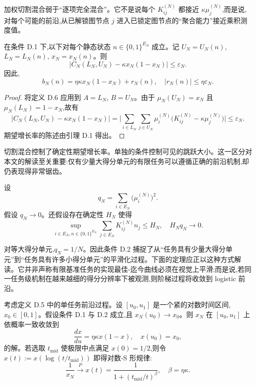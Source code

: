 加权切割混合弱于``逐项完全混合''。它不是说每个 $K^{(N)}_{ij}$ 都接近 $\kappa \mu^{(N)}_{j}$,而是说,对每个可能的前沿,从已解锁图节点 $j$ 进入已锁定图节点的``聚合能力''接近乘积测度值。

\begin{lemma}
在条件 D.1 下,以下对每个静态状态 $n \in \{0, 1\}^{E_{N}}$ 成立。记 $U_{N} = U_{N}(n)$, $L_{N} = L_{N}(n)$, $x_{N} = x_{N}(n)$。则
\[
    \bigl| C_{N}(L_{N}, U_{N}) - \kappa x_{N}(1 - x_{N}) \bigr| \leq \varepsilon_{N}.
\]
因此,
\[
    b_{N}(n) = \eta \kappa x_{N}(1 - x_{N}) + r_{N}(n), \quad |r_{N}(n)| \leq \eta \varepsilon_{N}.
\]
\end{lemma}

\begin{proof}
将定义 D.6 应用到 $A = L_{N}$, $B = U_{N}$。由于 $\mu_{N}(U_{N}) = x_{N}$ 且 $\mu_{N}(L_{N}) = 1 - x_{N}$,故有
\[
    \bigl| C_{N}(L_{N}, U_{N}) - \kappa x_{N}(1 - x_{N}) \bigr|
    = \biggl| \sum_{i \in L_{N}} \sum_{j \in U_{N}} \mu^{(N)}_{i} \bigl( K^{(N)}_{ij} - \kappa \mu^{(N)}_{j} \bigr) \biggr|
    \leq \varepsilon_{N}.
\]
期望增长率的陈述由引理 D.1 得出。
\end{proof}

切割混合控制了确定性期望增长率。单独的条件控制可见的跳跃大小。这一区分对本文的解读至关重要:仅有少量大得分单元的有限任务可以遵循正确的前沿机制,却仍表现得非常锯齿。

\begin{condition}[小得分单元与受控场]
设
\[
    q_{N} = \sum_{i \in E_{N}} \bigl( \mu^{(N)}_{i} \bigr)^{2}.
\]
假设 $q_{N} \to 0$。还假设存在确定性 $H_{N}$ 使得
\[
    \sup_{i \in E_{N}, n \in \{0, 1\}^{E_{N}}} \sum_{j \in E_{N}} K^{(N)}_{ij} n_{j} \leq H_{N}, \quad H_{N} q_{N} \to 0.
\]
\end{condition}

对等大得分单元,$q_{N} = 1/N$。因此条件 D.2 捕捉了从``任务具有少量大得分单元''到``任务具有许多小得分单元''的平滑化过程。下面的定理应正以这种方式解读。它并非声称有限基准任务的实现最佳-迄今曲线必须在视觉上平滑;而是说,若同一任务级机制在越来越细的得分分辨率下被观测,则阶梯过程将收敛到 logistic 前沿。

\begin{theorem}[单任务前沿的多单元极限]
考虑定义 D.5 中的单任务前沿过程。设 $[u_{0}, u_{1}]$ 是一个紧的对数时间区间,$x_{0} \in [0, 1]$。假设条件 D.1 与 D.2 成立,且 $x_{N}(u_{0}) \to x_{0}$。则 $x_{N}$ 在 $[u_{0}, u_{1}]$ 上依概率一致收敛到
\[
    \frac{dx}{du} = \eta \kappa x (1 - x), \quad x(u_{0}) = x_{0}, \tag{7}
\]
的解。若选取 $t_{\mathrm{mid}}$ 使极限中点满足 $x(0) = 1/2$,则令 $x(t) := x(\log(t / t_{\mathrm{mid}}))$ 即得对数-S 形规律:
\[
    \frac{1}{x_{N}} \xrightarrow{P} x(t) = \frac{1}{1 + (t_{\mathrm{mid}} / t)^{\beta}}, \quad \beta = \eta \kappa. \tag{8}
\]
\end{theorem}

